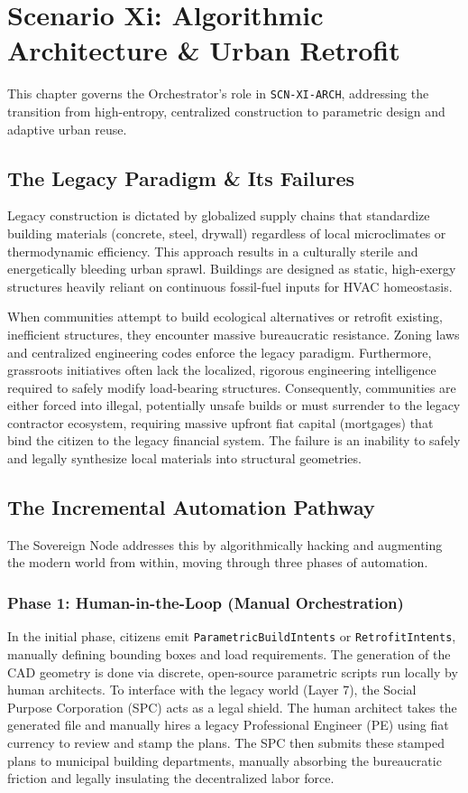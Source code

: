 \chapter{Scenario Xi: Algorithmic Architecture \& Urban Retrofit}
\label{ch:scenario_xi}

This chapter governs the Orchestrator's role in \texttt{SCN-XI-ARCH}, addressing the transition from high-entropy, centralized construction to parametric design and adaptive urban reuse.

\section{The Legacy Paradigm \& Its Failures}
Legacy construction is dictated by globalized supply chains that standardize building materials (concrete, steel, drywall) regardless of local microclimates or thermodynamic efficiency. This approach results in a culturally sterile and energetically bleeding urban sprawl. Buildings are designed as static, high-exergy structures heavily reliant on continuous fossil-fuel inputs for HVAC homeostasis. 

When communities attempt to build ecological alternatives or retrofit existing, inefficient structures, they encounter massive bureaucratic resistance. Zoning laws and centralized engineering codes enforce the legacy paradigm. Furthermore, grassroots initiatives often lack the localized, rigorous engineering intelligence required to safely modify load-bearing structures. Consequently, communities are either forced into illegal, potentially unsafe builds or must surrender to the legacy contractor ecosystem, requiring massive upfront fiat capital (mortgages) that bind the citizen to the legacy financial system. The failure is an inability to safely and legally synthesize local materials into structural geometries.

\section{The Incremental Automation Pathway}
The Sovereign Node addresses this by algorithmically hacking and augmenting the modern world from within, moving through three phases of automation.

\subsection{Phase 1: Human-in-the-Loop (Manual Orchestration)}
In the initial phase, citizens emit \texttt{ParametricBuildIntents} or \texttt{RetrofitIntents}, manually defining bounding boxes and load requirements. The generation of the CAD geometry is done via discrete, open-source parametric scripts run locally by human architects.
To interface with the legacy world (Layer 7), the Social Purpose Corporation (SPC) acts as a legal shield. The human architect takes the generated file and manually hires a legacy Professional Engineer (PE) using fiat currency to review and stamp the plans. The SPC then submits these stamped plans to municipal building departments, manually absorbing the bureaucratic friction and legally insulating the decentralized labor force.

